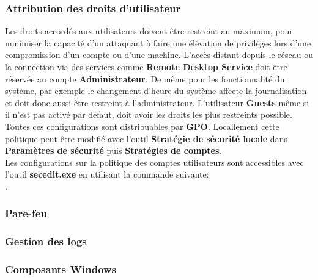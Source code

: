 \documentclass[twoside,a4paper,12pt,titlepage]{book}
\begin{document}
\subsubsection{Attribution des droits d'utilisateur}
Les droits accordés aux utilisateurs doivent être restreint au maximum, pour minimiser la capacité d'un attaquant à faire une élévation de privilèges lors d'une compromission d'un compte ou d'une machine. L'accès distant depuis le réseau ou la connection via des services comme \textbf{Remote Desktop Service} doit être réservée au compte \textbf{Administrateur}. De même pour les fonctionnalité du système, par exemple le changement d'heure du système affecte la journalisation et doit donc aussi être restreint à l'administrateur. L'utilisateur \textbf{Guests} même si il n'est pas activé par défaut, doit avoir les droits les plus restreints possible. Toutes ces configurations sont distribuables par \textbf{GPO}. Locallement cette politique peut être modifié avec l'outil \textbf{Stratégie de sécurité locale} dans \textbf{Paramètres de sécurité} puis \textbf{Stratégies de comptes}.\\

Les configurations sur la politique des comptes utilisateurs sont accessibles avec l'outil  \textbf{secedit.exe} en utilisant la commande suivante:\\ .\\

\subsubsection{Pare-feu}

\subsubsection{Gestion des logs}

\subsubsection{Composants Windows}
\end{document}
